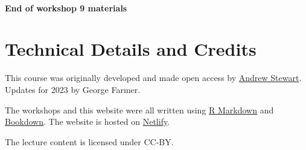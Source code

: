 \documentclass[
]{book}
\begin{document}
~~

\textbf{End of workshop 9 materials}

\hypertarget{technical-details-and-credits}{%
\chapter*{Technical Details and Credits}\label{technical-details-and-credits}}

This course was originally developed and made open access by \href{https://github.com/ajstewartlang}{Andrew Stewart}. Updates for 2023 by George Farmer.

The workshops and this website were all written using \href{https://rmarkdown.rstudio.com/}{R Markdown} and \href{https://bookdown.org/}{Bookdown}. The website is hosted on \href{https://www.netlify.com/}{Netlify}.

The lecture content is licensed under CC-BY.

  
\end{document}
